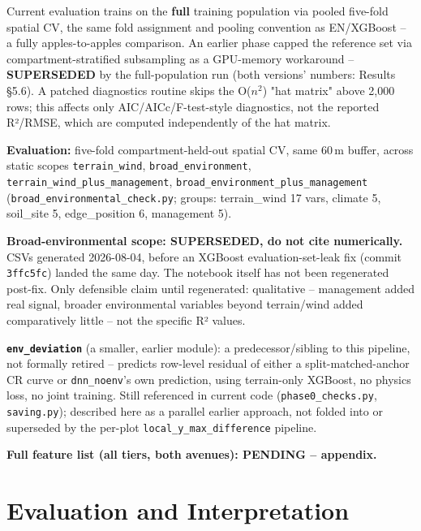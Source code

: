 \documentclass[11pt,a4paper]{report}
\begin{document}
Current evaluation trains on the \textbf{full} training population via pooled five-fold spatial CV,
the same fold assignment and pooling convention as EN/XGBoost -- a fully apples-to-apples
comparison. An earlier phase capped the reference set via compartment-stratified subsampling as a
GPU-memory workaround -- \textbf{SUPERSEDED} by the full-population run (both versions' numbers:
Results \S5.6). A patched diagnostics routine skips the O($n^2$) "hat matrix" above 2,000 rows;
this affects only AIC/AICc/F-test-style diagnostics, not the reported R²/RMSE, which are computed
independently of the hat matrix.

\textbf{Evaluation:} five-fold compartment-held-out spatial CV, same 60\,m buffer, across static
scopes \texttt{terrain\_wind}, \texttt{broad\_environment}, \texttt{terrain\_wind\_plus\_management},
\texttt{broad\_environment\_plus\_management} (\texttt{broad\_environmental\_check.py}; groups:
terrain\_wind 17 vars, climate 5, soil\_site 5, edge\_position 6, management 5).

\textbf{Broad-environmental scope: SUPERSEDED, do not cite numerically.} CSVs generated 2026-08-04,
before an XGBoost evaluation-set-leak fix (commit \texttt{3ffc5fc}) landed the same day. The
notebook itself has not been regenerated post-fix. Only defensible claim until regenerated:
qualitative -- management added real signal, broader environmental variables beyond terrain/wind
added comparatively little -- not the specific R² values.

\textbf{\texttt{env\_deviation}} (a smaller, earlier module): a predecessor/sibling to this
pipeline, not formally retired -- predicts row-level residual of either a split-matched-anchor CR
curve or \texttt{dnn\_noenv}'s own prediction, using terrain-only XGBoost, no physics loss, no
joint training. Still referenced in current code (\texttt{phase0\_checks.py}, \texttt{saving.py});
described here as a parallel earlier approach, not folded into or superseded by the per-plot
\texttt{local\_y\_max\_difference} pipeline.

\textbf{Full feature list (all tiers, both avenues): PENDING -- appendix.}

\section{Evaluation and Interpretation}
\end{document}
